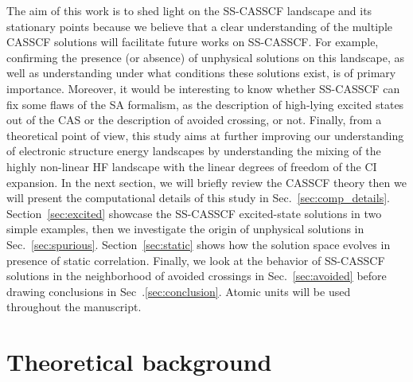 \documentclass[aip,jcp,reprint,noshowkeys,superscriptaddress]{revtex4-1}
\begin{document}
The aim of this work is to shed light on the SS-CASSCF landscape and its stationary points because we believe that a clear understanding of the multiple CASSCF solutions will facilitate future works on SS-CASSCF.
For example, confirming the presence (or absence) of unphysical solutions on this landscape, as well as understanding under what conditions these solutions exist, is of primary importance.
Moreover, it would be interesting to know whether SS-CASSCF can fix some flaws of the SA formalism, as the description of high-lying excited states out of the CAS or the description of avoided crossing, or not.
Finally, from a theoretical point of view, this study aims at further improving our understanding of electronic structure energy landscapes by understanding the mixing of the highly non-linear HF landscape with the linear degrees of freedom of the CI expansion.
In the next section, we will briefly review the CASSCF theory then we will present the computational details of this study in Sec.~\ref{sec:comp_details}.
Section~\ref{sec:excited} showcase the SS-CASSCF excited-state solutions in two simple examples, then we investigate the origin of unphysical solutions in Sec.~\ref{sec:spurious}.
Section~\ref{sec:static} shows how the solution space evolves in presence of static correlation.
Finally, we look at the behavior of SS-CASSCF solutions in the neighborhood of avoided crossings in Sec.~\ref{sec:avoided} before drawing conclusions in Sec~.\ref{sec:conclusion}.
Atomic units will be used throughout the manuscript.

\section{Theoretical background}
\label{sec:theoretical}

\end{document}
